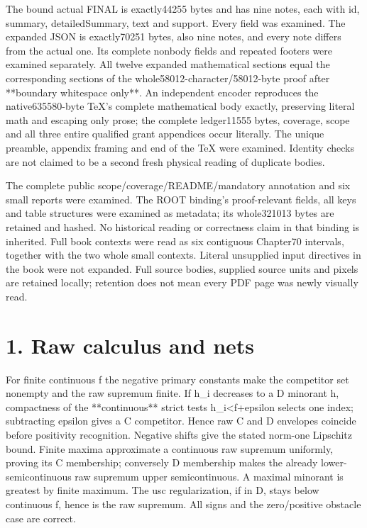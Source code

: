 \documentclass[11pt]{article}
\begin{document}
The bound actual FINAL is exactly44255 bytes and has nine notes, each with id, summary, detailedSummary, text and support. Every field was examined. The expanded JSON is exactly70251 bytes, also nine notes, and every note differs from the actual one. Its complete nonbody fields and repeated footers were examined separately. All twelve expanded mathematical sections equal the corresponding sections of the whole58012-character/58012-byte proof after **boundary whitespace only**. An independent encoder reproduces the native635580-byte TeX's complete mathematical body exactly, preserving literal math and escaping only prose; the complete ledger11555 bytes, coverage, scope and all three entire qualified grant appendices occur literally. The unique preamble, appendix framing and end of the TeX were examined. Identity checks are not claimed to be a second fresh physical reading of duplicate bodies.

The complete public scope/coverage/README/mandatory annotation and six small reports were examined. The ROOT binding's proof-relevant fields, all keys and table structures were examined as metadata; its whole321013 bytes are retained and hashed. No historical reading or correctness claim in that binding is inherited. Full book contexts were read as six contiguous Chapter70 intervals, together with the two whole small contexts. Literal unsupplied input directives in the book were not expanded. Full source bodies, supplied source units and pixels are retained locally; retention does not mean every PDF page was newly visually read.

\section{1. Raw calculus and nets}

For finite continuous f the negative primary constants make the competitor set nonempty and the raw supremum finite. If h\_i decreases to a D minorant h, compactness of the **continuous** strict tests h\_i<f+epsilon selects one index; subtracting epsilon gives a C competitor. Hence raw C and D envelopes coincide before positivity recognition. Negative shifts give the stated norm-one Lipschitz bound. Finite maxima approximate a continuous raw supremum uniformly, proving its C membership; conversely D membership makes the already lower-semicontinuous raw supremum upper semicontinuous. A maximal minorant is greatest by finite maximum. The usc regularization, if in D, stays below continuous f, hence is the raw supremum. All signs and the zero/positive obstacle case are correct.
\end{document}
